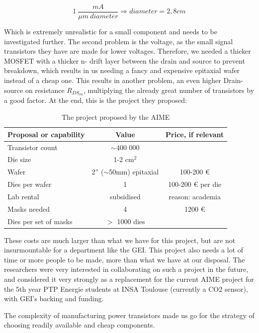 \begin{equation}
	1\ \frac{mA}{\mu m\ diameter} \Rightarrow diameter =  2,8 cm
\end{equation}

Which is extremely unrealistic for a small component and needs to be investigated further. The second problem is the voltage, as the small signal transistors they have are made for lower voltages. Therefore, we needed a thicker MOSFET with a thicker n- drift layer between the drain and source to prevent breakdown, which results in us needing a fancy and expensive epitaxial wafer instead of a cheap one. This results in another problem, an even higher Drain-source on resistance $R_{DS_{on}}$, multiplying the already great number of transistors by a good factor. At the end, this is the project they proposed:

\begin{table}[htbp]
\caption{The project proposed by the AIME}
\label{tab:AIME_project}
\centering
\begin{tabular}{lcc}
\toprule
\textbf{Proposal or capability} & \textbf{Value} & \textbf{Price, if relevant} \\
\midrule
Transistor count & $\sim$400 000 & \\
Die size & 1-2 cm$^2$ & \\
Wafer & 2'' ($\sim$50mm) epitaxial & 100-200 €  \\
Dies per wafer & 1 & 100-200 € per die \\
Lab rental & subsidised &  reason: academia  \\
Masks needed & 4 & 1200 € \\
Dies per set of masks & $>$ 1000 dies & \\
\bottomrule
\end{tabular}
\end{table}

These costs are much larger than what we have for this project, but are not insurmountable for a department like the GEI. This project also needs a lot of time or more people to be made, more than what we have at our disposal. The researchers were very interested in collaborating on such a project in the future, and considered it very strongly as a replacement for the current AIME project for the 5th year PTP Energie students at INSA Toulouse (currently a CO2 sensor), with GEI's backing and funding. 

The complexity of manufacturing power transistors made us go for the strategy of choosing readily available and cheap components.


